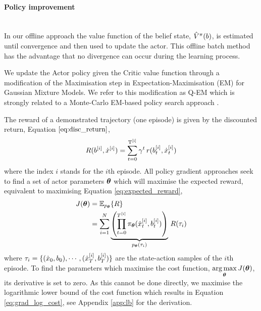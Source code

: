 \paragraph{Policy improvement}\\


In our offline approach the value function of the belief state, $\hat{V}^{\pi}(b)$, is estimated 
until convergence and then used to update the actor. This offline batch 
method has the advantage that no divergence can occur during the learning process.

We update the Actor policy given the Critic value function through a modification of the Maximisation step in  Expectation-Maximisation (EM) 
for Gaussian Mixture Models. We refer to this modification as Q-EM which is strongly related to a Monte-Carlo EM-based policy 
search approach \cite[p.50]{p_search_surv_2011}. 

The reward of a demonstrated trajectory (one episode) is given by the discounted return, Equation $\ref{eq:disc_return}$,
\begin{equation}\label{eq:disc_return}
 R(b^{[i]},\dot{x}^{[i]}) = \sum_{t=0}^{\mathrm{T^{[i]}}} \gamma^t \, r(b^{[i]}_t,\dot{x}^{[i]}_t)
\end{equation}
where the index $i$ stands for the $i$th episode.
All policy gradient approaches seek to find a set of actor parameters $\boldsymbol{\theta}$
which will maximise the expected reward, equivalent to maximising Equation \ref{eq:expected_reward},
\begin{align}\label{eq:expected_reward}
 J(\boldsymbol{\theta}) &= \mathbb{E}_{p_{\boldsymbol{\theta}}}\{R\} \nonumber \\
	  &= \sum\limits_{i=1}^{N}   \underbrace{\left( \prod_{t=0}^{T^{[i]}} \pi_{\boldsymbol{\theta}}(\dot{x}^{[i]}_t,b^{[i]}_t) \right)}_{p_{\boldsymbol{\theta}}(\tau_i)} \, R(\tau_i) 
\end{align}
where $\tau_i = \{(\dot{x}_0,b_0),\cdots,(\dot{x}_T^{[i]},b_T^{[i]}) \}$ are the state-action samples of the $i$th episode.
To find the parameters which maximise the cost function, $\operatorname*{arg\,max}\limits_{\boldsymbol{\theta}} J(\boldsymbol{\theta})$, its derivative is set to zero. 
As this cannot be done directly, we maximise the logarithmic lower bound of the cost function which results in 
Equation \ref{eq:grad_log_cost}, see Appendix \ref{app:lb} for the derivation.

